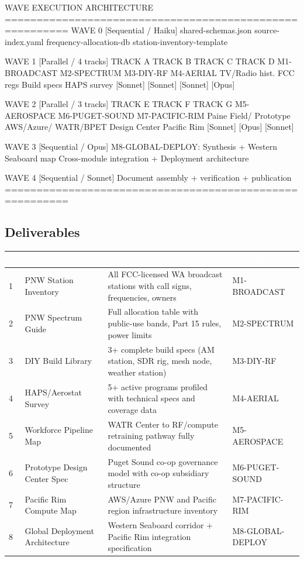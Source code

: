 \documentclass[11pt,letterpaper]{article}
\newcommand{\tableheader}[1]{\textbf{\sffamily\textcolor{white}{#1}}}
\begin{document}
\begin{asciibox}
WAVE EXECUTION ARCHITECTURE
========================================================
WAVE 0 [Sequential / Haiku]
  shared-schemas.json       source-index.yaml
  frequency-allocation-db   station-inventory-template

WAVE 1 [Parallel / 4 tracks]
  TRACK A          TRACK B          TRACK C        TRACK D
  M1-BROADCAST     M2-SPECTRUM      M3-DIY-RF      M4-AERIAL
  TV/Radio hist.   FCC regs         Build specs    HAPS survey
  [Sonnet]         [Sonnet]         [Sonnet]       [Opus]

WAVE 2 [Parallel / 3 tracks]
  TRACK E          TRACK F          TRACK G
  M5-AEROSPACE     M6-PUGET-SOUND   M7-PACIFIC-RIM
  Paine Field/     Prototype        AWS/Azure/
  WATR/BPET        Design Center    Pacific Rim
  [Sonnet]         [Opus]           [Sonnet]

WAVE 3 [Sequential / Opus]
  M8-GLOBAL-DEPLOY: Synthesis + Western Seaboard map
  Cross-module integration + Deployment architecture

WAVE 4 [Sequential / Sonnet]
  Document assembly + verification + publication
========================================================
\end{asciibox}

\subsection{Deliverables}

\begin{center}
\begin{tabularx}{\textwidth}{C{0.5cm}L{4cm}L{4.5cm}X}
\toprule
{}
\tableheader{\#} & \tableheader{Deliverable} & \tableheader{Acceptance Criteria} & \tableheader{Spec Reference} \\
 & PNW Station Inventory & All FCC-licensed WA broadcast stations with call signs, frequencies, owners & M1-BROADCAST \\
2 & PNW Spectrum Guide & Full allocation table with public-use bands, Part 15 rules, power limits & M2-SPECTRUM \\
3 & DIY Build Library & 3+ complete build specs (AM station, SDR rig, mesh node, weather station) & M3-DIY-RF \\
4 & HAPS/Aerostat Survey & 5+ active programs profiled with technical specs and coverage data & M4-AERIAL \\
5 & Workforce Pipeline Map & WATR Center to RF/compute retraining pathway fully documented & M5-AEROSPACE \\
6 & Prototype Design Center Spec & Puget Sound co-op governance model with co-op subsidiary structure & M6-PUGET-SOUND \\
7 & Pacific Rim Compute Map & AWS/Azure PNW and Pacific region infrastructure inventory & M7-PACIFIC-RIM \\
8 & Global Deployment Architecture & Western Seaboard corridor + Pacific Rim integration specification & M8-GLOBAL-DEPLOY \\
\bottomrule
\end{tabularx}
\end{center}
\end{document}
